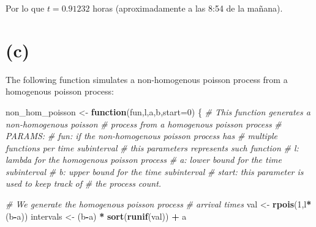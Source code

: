 \documentclass[]{article}
\newenvironment{Shaded}{\begin{snugshade}}{\end{snugshade}}
\newcommand{\CommentTok}[1]{\textcolor[rgb]{0.56,0.35,0.01}{\textit{#1}}}
\newcommand{\ControlFlowTok}[1]{\textcolor[rgb]{0.13,0.29,0.53}{\textbf{#1}}}
\newcommand{\DataTypeTok}[1]{\textcolor[rgb]{0.13,0.29,0.53}{#1}}
\newcommand{\DecValTok}[1]{\textcolor[rgb]{0.00,0.00,0.81}{#1}}
\newcommand{\KeywordTok}[1]{\textcolor[rgb]{0.13,0.29,0.53}{\textbf{#1}}}
\newcommand{\NormalTok}[1]{#1}
\newcommand{\OperatorTok}[1]{\textcolor[rgb]{0.81,0.36,0.00}{\textbf{#1}}}
\newcommand{\StringTok}[1]{\textcolor[rgb]{0.31,0.60,0.02}{#1}}
\begin{document}
Por lo que \(t = 0.91232\) horas (aproximadamente a las 8:54 de la
mañana).

\hypertarget{c}{%
\section{(c)}\label{c}}

The following function simulates a non-homogenous poisson process from a
homogenous poisson process:

\begin{Shaded}
\begin{Highlighting}[]
\NormalTok{non_hom_poisson <-}\StringTok{ }\ControlFlowTok{function}\NormalTok{(fun,l,a,b,}\DataTypeTok{start=}\DecValTok{0}\NormalTok{) \{}
    \CommentTok{# This function generates a non-homogenous poisson }
    \CommentTok{# process from a homogenous poisson process}
    \CommentTok{# PARAMS:}
    \CommentTok{# fun:   if the non-homogenous poisson process has}
    \CommentTok{#        multiple functions per time subinterval}
    \CommentTok{#        this parameters represents such function}
    \CommentTok{# l:     lambda for the homogenous poisson process}
    \CommentTok{# a:     lower bound for the time subinterval}
    \CommentTok{# b:     upper bound for the time subinterval}
    \CommentTok{# start: this parameter is used to keep track of }
    \CommentTok{#        the process count.}
    
    \CommentTok{# We generate the homogenous poisson process }
    \CommentTok{# arrival times}
\NormalTok{    val <-}\StringTok{ }\KeywordTok{rpois}\NormalTok{(}\DecValTok{1}\NormalTok{,l}\OperatorTok{*}\NormalTok{(b}\OperatorTok{-}\NormalTok{a))}
\NormalTok{    intervals <-}\StringTok{ }\NormalTok{(b}\OperatorTok{-}\NormalTok{a) }\OperatorTok{*}\StringTok{ }\KeywordTok{sort}\NormalTok{(}\KeywordTok{runif}\NormalTok{(val)) }\OperatorTok{+}\StringTok{ }\NormalTok{a}


\end{Highlighting}
\end{Shaded}
\end{document}

